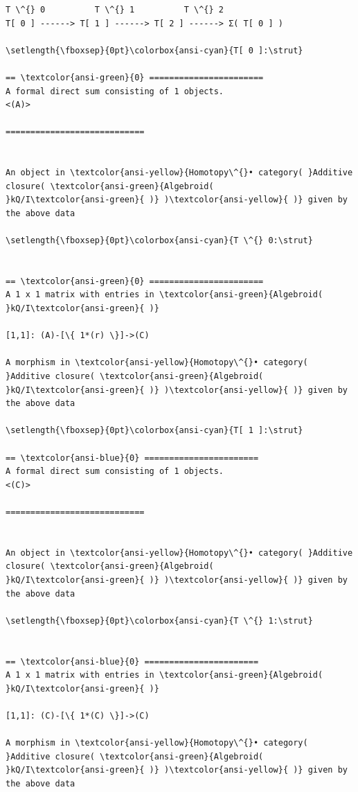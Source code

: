 \documentclass[11pt]{article}
\begin{document}
    \begin{Verbatim}[commandchars=\\\{\}]
       T \^{} 0          T \^{} 1          T \^{} 2
T[ 0 ] ------> T[ 1 ] ------> T[ 2 ] ------> Σ( T[ 0 ] )

\setlength{\fboxsep}{0pt}\colorbox{ansi-cyan}{T[ 0 ]:\strut}

== \textcolor{ansi-green}{0} =======================
A formal direct sum consisting of 1 objects.
<(A)>

============================


An object in \textcolor{ansi-yellow}{Homotopy\^{}• category( }Additive closure( \textcolor{ansi-green}{Algebroid(
}kQ/I\textcolor{ansi-green}{ )} )\textcolor{ansi-yellow}{ )} given by the above data

\setlength{\fboxsep}{0pt}\colorbox{ansi-cyan}{T \^{} 0:\strut}


== \textcolor{ansi-green}{0} =======================
A 1 x 1 matrix with entries in \textcolor{ansi-green}{Algebroid( }kQ/I\textcolor{ansi-green}{ )}

[1,1]: (A)-[\{ 1*(r) \}]->(C)

A morphism in \textcolor{ansi-yellow}{Homotopy\^{}• category( }Additive closure( \textcolor{ansi-green}{Algebroid(
}kQ/I\textcolor{ansi-green}{ )} )\textcolor{ansi-yellow}{ )} given by the above data

\setlength{\fboxsep}{0pt}\colorbox{ansi-cyan}{T[ 1 ]:\strut}

== \textcolor{ansi-blue}{0} =======================
A formal direct sum consisting of 1 objects.
<(C)>

============================


An object in \textcolor{ansi-yellow}{Homotopy\^{}• category( }Additive closure( \textcolor{ansi-green}{Algebroid(
}kQ/I\textcolor{ansi-green}{ )} )\textcolor{ansi-yellow}{ )} given by the above data

\setlength{\fboxsep}{0pt}\colorbox{ansi-cyan}{T \^{} 1:\strut}


== \textcolor{ansi-blue}{0} =======================
A 1 x 1 matrix with entries in \textcolor{ansi-green}{Algebroid( }kQ/I\textcolor{ansi-green}{ )}

[1,1]: (C)-[\{ 1*(C) \}]->(C)

A morphism in \textcolor{ansi-yellow}{Homotopy\^{}• category( }Additive closure( \textcolor{ansi-green}{Algebroid(
}kQ/I\textcolor{ansi-green}{ )} )\textcolor{ansi-yellow}{ )} given by the above data


\end{Verbatim}
\end{document}
